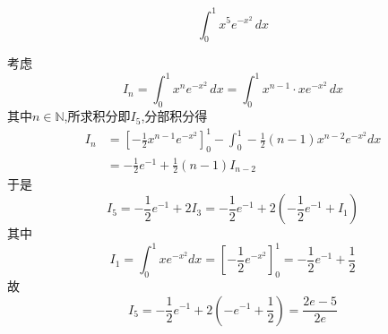 \begin{questions}
    \question
    \[
    \int_{0}^{1} x^5 e^{-x^2} \,dx
    \]
    \begin{solution}
        考虑
        \[
        I_n = \int_{0}^{1} x^n e^{-x^2} \,dx = \int_{0}^{1} x^{n-1} \cdot x e^{-x^2} \,dx
        \]
        其中$n \in \mathbb{N}$,所求积分即$I_5$,分部积分得
        \begin{align*}
        I_n &= \left[-\frac{1}{2} x^{n-1} e^{-x^2} \right]_{0}^{1} - \int_{0}^{1} -\frac{1}{2} (n-1) x^{n-2} e^{-x^2} dx \\
        &= -\frac{1}{2} e^{-1} + \frac{1}{2}(n-1) I_{n-2}
        \end{align*}
        于是
        \[
        I_5 = -\frac{1}{2} e^{-1} + 2 I_3 = -\frac{1}{2} e^{-1} + 2\left(-\frac{1}{2} e^{-1} + I_1\right)
        \]
        其中
        \[
        I_1 = \int_{0}^{1} x e^{-x^2} dx = \left[-\frac{1}{2} e^{-x^2} \right]_0^1 = -\frac{1}{2} e^{-1} + \frac{1}{2}
        \]
        故
        \[
        I_5 = -\frac{1}{2} e^{-1} + 2 \left(- e^{-1} + \frac{1}{2} \right) = \frac{2e - 5}{2e}
        \]
    \end{solution}

    \question
\end{questions}
